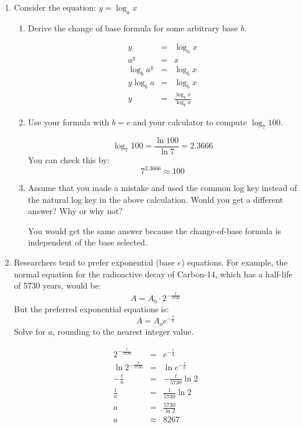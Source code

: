 \documentclass[letterpaper,12pt,fleqn]{article}
\begin{document}
\begin{enumerate}
\item Consider the equation: $y=\log_a{x}$
  \begin{enumerate}
  \item Derive the change of base formula for some arbitrary base $b$.

    \begin{eqnarray*}
      y &=& \log_a{x} \\
      a^y &=& x \\
      \log_b{a^y} &=& \log_b{x} \\
      y\log_b{a} &=& \log_b{x} \\
      y &=& \frac{\log_b{x}}{\log_b{a}}
    \end{eqnarray*}
    
  \item Use your formula with $b=e$ and your calculator to compute
    $\log_7 100$.

    \[\log_7 100=\frac{\ln{100}}{\ln{7}}=2.3666\]
    You can check this by:
    \[7^{2.3666}\approx100\]
    
  \item Assume that you made a mistake and used the common log key instead of
    the natural log key in the above calculation. Would you get a different
    answer? Why or why not?

    You would get the same answer because the change-of-base formula is
    independent of the base selected.
  \end{enumerate}

\item Researchers tend to prefer exponential (base $e$) equations. For example,
  the normal equation for the radioactive decay of Carbon-14, which has a
  half-life of 5730 years, would be:
  \[A=A_0\cdot2^{-\frac{t}{5730}}\]
  But the preferred exponential equations is:
  \[A=A_oe^{-\frac{t}{a}}\]
  Solve for $a$, rounding to the nearest integer value.

  \begin{eqnarray*}
    2^{-\frac{t}{5730}} &=& e^{-\frac{t}{a}} \\
    \ln{2^{-\frac{t}{5730}}} &=& \ln{e^{-\frac{t}{a}}} \\
    -\frac{t}{a} &=& -\frac{t}{5730}\ln{2} \\
    \frac{1}{a} &=& \frac{1}{5730}\ln{2} \\
    a &=& \frac{5730}{\ln{2}} \\
    a &\approx& 8267
  \end{eqnarray*}
\end{enumerate}
\end{document}

